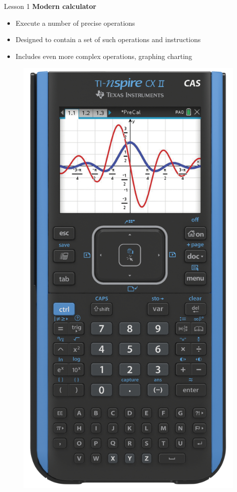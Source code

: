 \documentclass[aspectratio=1610]{beamer}
\begin{document}
\begin{frame}{Lesson 1}{}
{\Large\textbf{{Modern calculator}}}
\Large
\begin{minipage}{0.70\textwidth}
    \begin{itemize}
      \item Execute a number of precise operations
      \item Designed to contain a set of such operations and instructions
      \item Includes even more complex operations, graphing charting 
    \end{itemize}
  \end{minipage}
\begin{minipage}{.0\textwidth}
      \begin{figure}
        \includegraphics[scale=0.60]{Images/TI}

\end{figure}
\end{minipage}
\end{frame}
\end{document}
